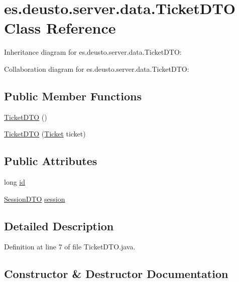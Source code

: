 \hypertarget{classes_1_1deusto_1_1server_1_1data_1_1_ticket_d_t_o}{}\section{es.\+deusto.\+server.\+data.\+Ticket\+D\+TO Class Reference}
\label{classes_1_1deusto_1_1server_1_1data_1_1_ticket_d_t_o}


Inheritance diagram for es.\+deusto.\+server.\+data.\+Ticket\+D\+TO\+:


Collaboration diagram for es.\+deusto.\+server.\+data.\+Ticket\+D\+TO\+:
\subsection*{Public Member Functions}
\begin{DoxyCompactItemize}
\item 
\mbox{\hyperlink{classes_1_1deusto_1_1server_1_1data_1_1_ticket_d_t_o_a3004b4770c42f61331b6eaab06ff096b}{Ticket\+D\+TO}} ()
\item 
\mbox{\hyperlink{classes_1_1deusto_1_1server_1_1data_1_1_ticket_d_t_o_ad3d32eef4ab6ad5ea98cc7aa35d3de50}{Ticket\+D\+TO}} (\mbox{\hyperlink{classes_1_1deusto_1_1server_1_1jdo_1_1_ticket}{Ticket}} ticket)
\end{DoxyCompactItemize}
\subsection*{Public Attributes}
\begin{DoxyCompactItemize}
\item 
long \mbox{\hyperlink{classes_1_1deusto_1_1server_1_1data_1_1_ticket_d_t_o_a1602514fbada31dc44edc01bf359c401}{id}}
\item 
\mbox{\hyperlink{classes_1_1deusto_1_1server_1_1data_1_1_session_d_t_o}{Session\+D\+TO}} \mbox{\hyperlink{classes_1_1deusto_1_1server_1_1data_1_1_ticket_d_t_o_a9d76a5dad7b29b3ea22f11df64f75483}{session}}
\end{DoxyCompactItemize}


\subsection{Detailed Description}


Definition at line 7 of file Ticket\+D\+T\+O.\+java.



\subsection{Constructor \& Destructor Documentation}
\mbox{\label{classes_1_1deusto_1_1server_1_1data_1_1_ticket_d_t_o_a3004b4770c42f61331b6eaab06ff096b}} 
